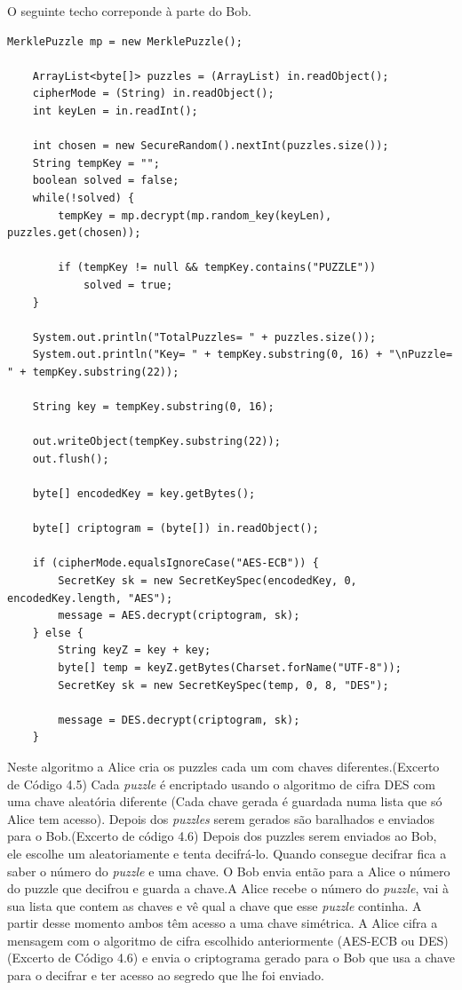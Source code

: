 O seguinte techo correponde à parte do Bob.
\begin{lstlisting}[caption=Trecho de código usado no projeto.]
    MerklePuzzle mp = new MerklePuzzle();
                    
    ArrayList<byte[]> puzzles = (ArrayList) in.readObject();
    cipherMode = (String) in.readObject();
    int keyLen = in.readInt();
    
    int chosen = new SecureRandom().nextInt(puzzles.size());
    String tempKey = "";
    boolean solved = false;
    while(!solved) {
        tempKey = mp.decrypt(mp.random_key(keyLen), puzzles.get(chosen));
        
        if (tempKey != null && tempKey.contains("PUZZLE"))
            solved = true;
    }
    
    System.out.println("TotalPuzzles= " + puzzles.size());
    System.out.println("Key= " + tempKey.substring(0, 16) + "\nPuzzle= " + tempKey.substring(22));
    
    String key = tempKey.substring(0, 16);

    out.writeObject(tempKey.substring(22));
    out.flush();
    
    byte[] encodedKey = key.getBytes();
    
    byte[] criptogram = (byte[]) in.readObject();
    
    if (cipherMode.equalsIgnoreCase("AES-ECB")) {
        SecretKey sk = new SecretKeySpec(encodedKey, 0, encodedKey.length, "AES");
        message = AES.decrypt(criptogram, sk);
    } else {
        String keyZ = key + key;
        byte[] temp = keyZ.getBytes(Charset.forName("UTF-8"));
        SecretKey sk = new SecretKeySpec(temp, 0, 8, "DES");
        
        message = DES.decrypt(criptogram, sk);
    }
\end{lstlisting}
Neste algoritmo a Alice cria os puzzles cada um com chaves diferentes.(Excerto de Código 4.5) Cada \textit{puzzle} é encriptado usando o algoritmo de cifra DES com uma chave aleatória diferente (Cada chave gerada é guardada numa lista que só Alice tem acesso). Depois dos \textit{puzzles} serem gerados são baralhados e enviados para o Bob.(Excerto de código 4.6) Depois dos puzzles serem enviados ao Bob, ele escolhe um aleatoriamente e tenta decifrá-lo. Quando consegue decifrar fica a saber o número do \textit{puzzle} e uma chave. O Bob envia então para a Alice o número do puzzle que decifrou e guarda a chave.A Alice recebe o número do \textit{puzzle}, vai à sua lista que contem as chaves e vê qual a chave que esse \textit{puzzle} continha. A partir desse momento ambos têm acesso a uma chave simétrica. A Alice cifra a mensagem com o algoritmo de cifra escolhido anteriormente (AES-ECB ou DES)(Excerto de Código 4.6) e envia o criptograma gerado para o Bob que usa a chave para o decifrar e ter acesso ao segredo que lhe foi enviado.


